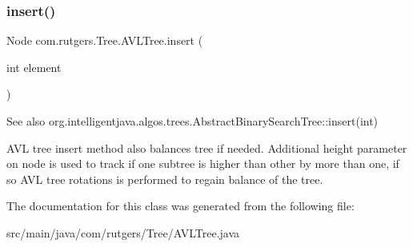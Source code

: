 \subsubsection{\texorpdfstring{insert()}{insert()}}
{\footnotesize\ttfamily Node com.\+rutgers.\+Tree.\+A\+V\+L\+Tree.\+insert (\begin{DoxyParamCaption}\item[{int}]{element }\end{DoxyParamCaption})}

\begin{DoxySeeAlso}{See also}
org.\+intelligentjava.\+algos.\+trees.\+Abstract\+Binary\+Search\+Tree\+::insert(int) \begin{DoxyVerb} AVL tree insert method also balances tree if needed. Additional
 height parameter on node is used to track if one subtree is higher
 than other by more than one, if so AVL tree rotations is performed
 to regain balance of the tree.\end{DoxyVerb}
 
\end{DoxySeeAlso}


The documentation for this class was generated from the following file\+:\begin{DoxyCompactItemize}
\item 
src/main/java/com/rutgers/\+Tree/A\+V\+L\+Tree.\+java\end{DoxyCompactItemize}
